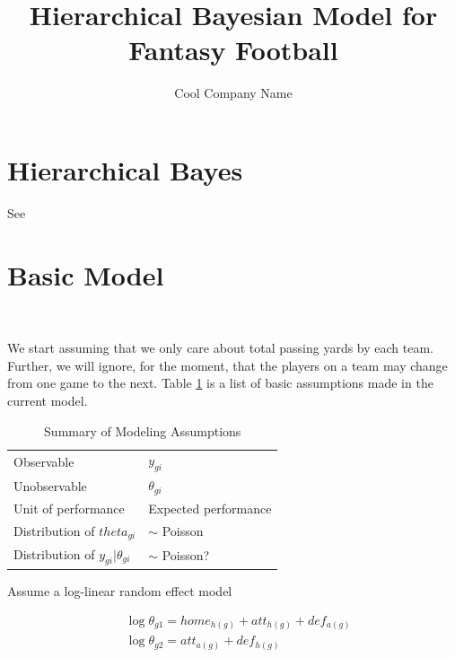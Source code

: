 \documentclass[11pt]{article}
\title{Hierarchical Bayesian Model for Fantasy Football}
\author{Cool Company Name}
\begin{document}

\maketitle 
\setlength{\parindent}{0ex}

\section{Hierarchical Bayes}
See \cite{baio2010bayesian}
\section{Basic Model}
\printnomenclature
{}
 \

 We start assuming that we only care about total passing yards by each team. Further, we will ignore, for the moment, that the players on a team may change from one game to the next. Table \ref{table:ma1} is a list of basic assumptions made in the current model.


 \begin{table}
   \centering
   \begin{tabular}{l l}
     \toprule
     Observable & $y_{gi}$ \\
     Unobservable & $\theta_{gi}$ \\
     Unit of performance & Expected performance\\
     Distribution of $theta_{gi}$ & $\sim$ Poisson\\
     Distribution of $y_{gi} | \theta_{gi}$ & $\sim$ Poisson?\\     
     \bottomrule
   \end{tabular}
   \caption{Summary of Modeling Assumptions}
   \label{table:ma1}
 \end{table}


Assume a log-linear random effect model

\begin{equation}
  \label{eq:4}
  \begin{aligned}
   & \log{\theta_{g1}} = home_{h(g)} + att_{h(g)} + def_{a(g)}  \\
   & \log{\theta_{g2}} = att_{a(g)} + def_{h(g)} 
  \end{aligned}
\end{equation}
\end{document}
